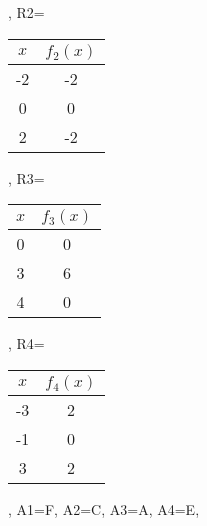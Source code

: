 \begin{beispiel}[FA 4.2]{1}
{{\begin{tabular}{|c|c|}
			\hline
			\end{tabular}
			},				%
				R2={\begin{tabular}{|c|c|}
			\hline
			$x$&$f_2(x)$\\
			\hline
			-2&-2\\
			\hline
			0&0\\
			\hline
			2&-2\\
			\hline
			\end{tabular}},				%
				R3={\begin{tabular}{|c|c|}
			\hline
			$x$&$f_3(x)$\\
			\hline
			0&0\\
			\hline
			3&6\\
			\hline
			4&0\\
			\hline
			\end{tabular}},				%
				R4={\begin{tabular}{|c|c|}
			\hline
			$x$&$f_4(x)$\\
			\hline
			-3&2\\
			\hline
			-1&0\\
			\hline
			3&2\\
			\hline
			\end{tabular}},				%
				A1={F},				%
				A2={C},				%
				A3={A},				%
				A4={E},				%
				}
\end{beispiel}